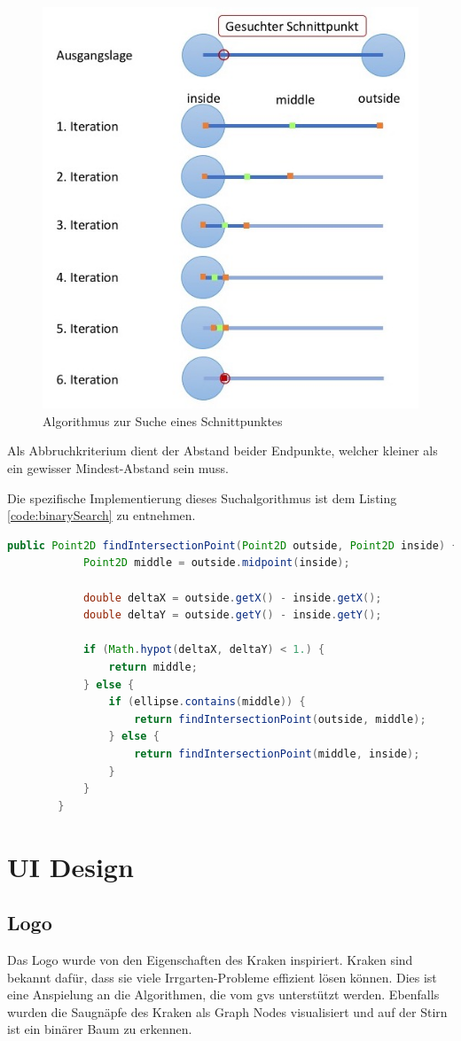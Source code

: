 \documentclass[11pt,a4paper,english,oneside]{book}
\numberwithin{equation}{chapter}
\begin{document}
	\begin{figure}
		\centering
		\includegraphics[width=0.7\linewidth]{assets/images/binarySearch}
		\caption{Algorithmus zur Suche eines Schnittpunktes}
		\label{fig:binarySearch}
	\end{figure}

	Als Abbruchkriterium dient der Abstand beider Endpunkte, welcher kleiner als ein gewisser Mindest-Abstand sein muss.
	
	Die spezifische Implementierung dieses Suchalgorithmus ist dem Listing \ref{code:binarySearch} zu entnehmen.
	
	\begin{lstlisting}[language=java, frame=single,caption={Algorithmus Schnittpunkt Suche}, label={code:binarySearch}]
		public Point2D findIntersectionPoint(Point2D outside, Point2D inside) {
			Point2D middle = outside.midpoint(inside);
		
			double deltaX = outside.getX() - inside.getX();
			double deltaY = outside.getY() - inside.getY();
		
			if (Math.hypot(deltaX, deltaY) < 1.) {
				return middle;
			} else {
				if (ellipse.contains(middle)) {
					return findIntersectionPoint(outside, middle);
				} else {
					return findIntersectionPoint(middle, inside);
				}
			}
		}
	\end{lstlisting}
	
	\section{UI Design}
	
	\subsection{Logo}
	Das Logo wurde von den Eigenschaften des Kraken \cite{kraken} inspiriert. Kraken sind bekannt dafür, dass sie viele Irrgarten-Probleme effizient lösen können. Dies ist eine Anspielung an die Algorithmen, die vom \gls{gvs} unterstützt werden. Ebenfalls wurden die Saugnäpfe des Kraken als Graph Nodes visualisiert und auf der Stirn ist ein binärer Baum zu erkennen. 
	
\end{document}
